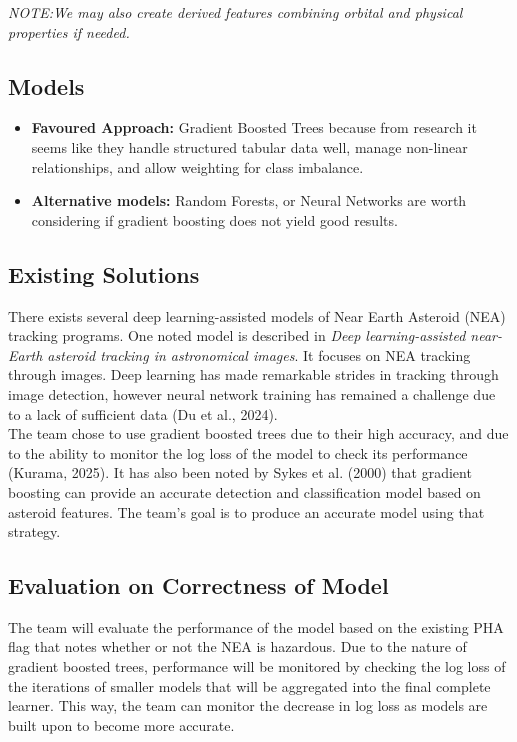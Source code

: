 \documentclass[12pt]{article}
\begin{document}
\emph{NOTE:We may also create derived features combining orbital and physical properties if needed.}


\subsection*{Models}
\begin{itemize}
    \item \textbf{Favoured Approach:} Gradient Boosted Trees because from research it seems like they handle structured tabular data well, manage non-linear relationships, and allow weighting for class imbalance.

    \item \textbf{Alternative models:} Random Forests, or Neural Networks are worth considering if gradient boosting does not yield good results.
    
\end{itemize}

\subsection*{Existing Solutions}
\medskip
There exists several deep learning-assisted models of Near Earth Asteroid (NEA) tracking programs. One noted model is described in \textit{Deep learning-assisted near-Earth asteroid tracking in astronomical images}. It focuses on NEA tracking through images. Deep learning has made remarkable strides in tracking through image detection, however neural network training has remained a challenge due to a lack of sufficient data (Du et al., 2024). \\


The team chose to use gradient boosted trees due to their high accuracy, and due to the ability to monitor the log loss of the model to check its performance (Kurama, 2025). It has also been noted by Sykes et al. (2000) that gradient boosting can provide an accurate detection and classification model based on asteroid features. The team's goal is to produce an accurate model using that strategy. 

\subsection*{Evaluation on Correctness of Model}

The team will evaluate the performance of the model based on the existing PHA flag that notes whether or not the NEA is hazardous. Due to the nature of gradient boosted trees, performance will be monitored by checking the log loss of the iterations of smaller models that will be aggregated into the final complete learner. This way, the team can monitor the decrease in log loss as models are built upon to become more accurate. 
\end{document}
